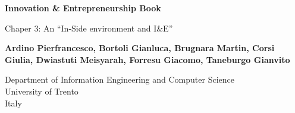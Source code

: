
\begin{titlepage}
    \begin{center}
        \vspace*{1cm}

        \Huge
        \textbf{Innovation \& Entrepreneurship Book}

        \vspace{0.5cm}
        \LARGE
        Chaper 3: An ``In-Side environment and I\&E''

        \vspace{1.5cm}

        \textbf{
            Ardino Pierfrancesco,
            Bortoli Gianluca,
            Brugnara Martin,
            Corsi Giulia,
            Dwiastuti Meisyarah,
            Forresu Giacomo,
            Taneburgo Gianvito
        }

        \vfill

        \vspace{0.8cm}
        \Large
        Department of Information Engineering and Computer Science\\
        University of Trento\\
        Italy\\
    \end{center}
\end{titlepage}
